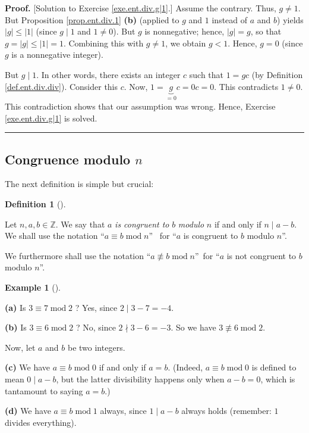 \documentclass[numbers=enddot,12pt,final,onecolumn,notitlepage]{scrartcl}%
\numberwithin{exer}{subsection}
\theoremstyle{definition}
\newtheorem{defi}[theo]{Definition}
\newenvironment{definition}[1][]
{\begin{defi}[#1]\begin{leftbar}}
{\end{leftbar}\end{defi}}
\newtheorem{exam}[theo]{Example}
\newenvironment{example}[1][]
{\begin{exam}[#1]\begin{leftbar}}
{\end{leftbar}\end{exam}}
\newenvironment{fineprint}{\begin{small}}{\end{small}}
\newenvironment{proof}[1][Proof]{\noindent\textbf{#1.} }{\ \rule{0.5em}{0.5em}}
\begin{document}
\begin{fineprint}
\begin{proof}
[Solution to Exercise \ref{exe.ent.div.g|1}.] Assume the contrary. Thus,
$g\neq1$. But Proposition \ref{prop.ent.div.1} \textbf{(b)} (applied to $g$
and $1$ instead of $a$ and $b$) yields $\left\vert g\right\vert \leq\left\vert
1\right\vert $ (since $g\mid1$ and $1\neq0$). But $g$ is nonnegative; hence,
$\left\vert g\right\vert =g$, so that $g=\left\vert g\right\vert
\leq\left\vert 1\right\vert =1$. Combining this with $g\neq1$, we obtain
$g<1$. Hence, $g=0$ (since $g$ is a nonnegative integer).

But $g\mid1$. In other words, there exists an integer $c$ such that $1=gc$
(by Definition \ref{def.ent.div.div}). Consider this $c$. Now,
$1=\underbrace{g}_{=0}c=0c=0$. This contradicts $1\neq0$. This contradiction
shows that our assumption was wrong. Hence, Exercise \ref{exe.ent.div.g|1} is solved.
\end{proof}
\end{fineprint}

\subsection{Congruence modulo $n$}

The next definition is simple but crucial:

\begin{definition}
\label{def.ent.cong}Let $n,a,b\in\mathbb{Z}$. We say that $a$ \textit{is
congruent to }$b$ \textit{modulo }$n$ if and only if $n\mid a-b$. We shall use
the notation \textquotedblleft$a\equiv b\operatorname{mod}n$\textquotedblright%
\ for \textquotedblleft$a$ is congruent to $b$ modulo $n$\textquotedblright.

We furthermore shall use the notation \textquotedblleft$a\not \equiv
b\operatorname{mod}n$\textquotedblright\ for \textquotedblleft$a$ is not
congruent to $b$ modulo $n$\textquotedblright.
\end{definition}

\begin{example}
\label{exa.ent.cong.triv}\textbf{(a)} Is $3\equiv7\operatorname{mod}2$ ? Yes,
since $2\mid3-7=-4$.

\textbf{(b)} Is $3\equiv6\operatorname{mod}2$ ? No, since $2\nmid3-6=-3$. So
we have $3\not \equiv 6\operatorname{mod}2$.

Now, let $a$ and $b$ be two integers.

\textbf{(c)} We have $a\equiv b\operatorname{mod}0$ if and only if $a=b$.
(Indeed, $a\equiv b\operatorname{mod}0$ is defined to mean $0\mid a-b$, but
the latter divisibility happens only when $a-b=0$, which is tantamount to
saying $a=b$.)

\textbf{(d)} We have $a\equiv b\operatorname{mod}1$ always, since $1\mid a-b$
always holds (remember: $1$ divides everything).
\end{example}
\end{document}
